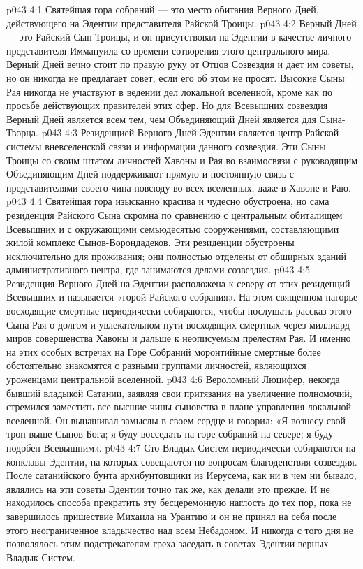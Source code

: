 \vs p043 4:1 Святейшая гора собраний --- это место обитания Верного Дней, действующего на Эдентии представителя Райской Троицы.
\vs p043 4:2 Верный Дней --- это Райский Сын Троицы, и он присутствовал на Эдентии в качестве личного представителя Иммануила со времени сотворения этого центрального мира. Верный Дней вечно стоит по правую руку от Отцов Созвездия и дает им советы, но он никогда не предлагает совет, если его об этом не просят. Высокие Сыны Рая никогда не участвуют в ведении дел локальной вселенной, кроме как по просьбе действующих правителей этих сфер. Но для Всевышних созвездия Верный Дней является всем тем, чем Объединяющий Дней является для Сына\hyp{}Творца.
\vs p043 4:3 Резиденцией Верного Дней Эдентии является центр Райской системы вневселенской связи и информации данного созвездия. Эти Сыны Троицы со своим штатом личностей Хавоны и Рая во взаимосвязи с руководящим Объединяющим Дней поддерживают прямую и постоянную связь с представителями своего чина повсюду во всех вселенных, даже в Хавоне и Раю.
\vs p043 4:4 Святейшая гора изысканно красива и чудесно обустроена, но сама резиденция Райского Сына скромна по сравнению с центральным обиталищем Всевышних и с окружающими семьюдесятью сооружениями, составляющими жилой комплекс Сынов\hyp{}Ворондадеков. Эти резиденции обустроены исключительно для проживания; они полностью отделены от обширных зданий административного центра, где занимаются делами созвездия.
\vs p043 4:5 Резиденция Верного Дней на Эдентии расположена к северу от этих резиденций Всевышних и называется «горой Райского собрания». На этом священном нагорье восходящие смертные периодически собираются, чтобы послушать рассказ этого Сына Рая о долгом и увлекательном пути восходящих смертных через миллиард миров совершенства Хавоны и дальше к неописуемым прелестям Рая. И именно на этих особых встречах на Горе Собраний моронтийные смертные более обстоятельно знакомятся с разными группами личностей, являющихся уроженцами центральной вселенной.
\vs p043 4:6 Вероломный Люцифер, некогда бывший владыкой Сатании, заявляя свои притязания на увеличение полномочий, стремился заместить все высшие чины сыновства в плане управления локальной вселенной. Он вынашивал замыслы в своем сердце и говорил: «Я вознесу свой трон выше Сынов Бога; я буду восседать на горе собраний на севере; я буду подобен Всевышним».
\vs p043 4:7 \pc Сто Владык Систем периодически собираются на конклавы Эдентии, на которых совещаются по вопросам благоденствия созвездия. После сатанийского бунта архибунтовщики из Иерусема, как ни в чем ни бывало, являлись на эти советы Эдентии точно так же, как делали это прежде. И не находилось способа прекратить эту бесцеремонную наглость до тех пор, пока не завершилось пришествие Михаила на Урантию и он не принял на себя после этого неограниченное владычество над всем Небадоном. И никогда с того дня не позволялось этим подстрекателям греха заседать в советах Эдентии верных Владык Систем.
